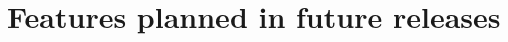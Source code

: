 \documentclass{article}
\begin{document}
\section*{Features planned in future releases}


\end{document}

